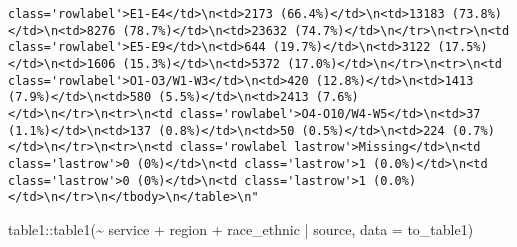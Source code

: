 \documentclass[
]{article}
\newenvironment{Shaded}{\begin{snugshade}}{\end{snugshade}}
\newcommand{\AttributeTok}[1]{\textcolor[rgb]{0.77,0.63,0.00}{#1}}
\newcommand{\FunctionTok}[1]{\textcolor[rgb]{0.00,0.00,0.00}{#1}}
\newcommand{\NormalTok}[1]{#1}
\newcommand{\SpecialCharTok}[1]{\textcolor[rgb]{0.00,0.00,0.00}{#1}}
\begin{document}
\begin{verbatim}
class='rowlabel'>E1-E4</td>\n<td>2173 (66.4%)</td>\n<td>13183 (73.8%)</td>\n<td>8276 (78.7%)</td>\n<td>23632 (74.7%)</td>\n</tr>\n<tr>\n<td class='rowlabel'>E5-E9</td>\n<td>644 (19.7%)</td>\n<td>3122 (17.5%)</td>\n<td>1606 (15.3%)</td>\n<td>5372 (17.0%)</td>\n</tr>\n<tr>\n<td class='rowlabel'>O1-O3/W1-W3</td>\n<td>420 (12.8%)</td>\n<td>1413 (7.9%)</td>\n<td>580 (5.5%)</td>\n<td>2413 (7.6%)</td>\n</tr>\n<tr>\n<td class='rowlabel'>O4-O10/W4-W5</td>\n<td>37 (1.1%)</td>\n<td>137 (0.8%)</td>\n<td>50 (0.5%)</td>\n<td>224 (0.7%)</td>\n</tr>\n<tr>\n<td class='rowlabel lastrow'>Missing</td>\n<td class='lastrow'>0 (0%)</td>\n<td class='lastrow'>1 (0.0%)</td>\n<td class='lastrow'>0 (0%)</td>\n<td class='lastrow'>1 (0.0%)</td>\n</tr>\n</tbody>\n</table>\n"
\end{verbatim}

\begin{Shaded}
\begin{Highlighting}[]
\NormalTok{table1}\SpecialCharTok{::}\FunctionTok{table1}\NormalTok{(}\SpecialCharTok{\textasciitilde{}}\NormalTok{ service }\SpecialCharTok{+}\NormalTok{ region }\SpecialCharTok{+}\NormalTok{ race\_ethnic }\SpecialCharTok{|}\NormalTok{ source, }\AttributeTok{data =}\NormalTok{ to\_table1)}
\end{Highlighting}
\end{Shaded}
\end{document}
